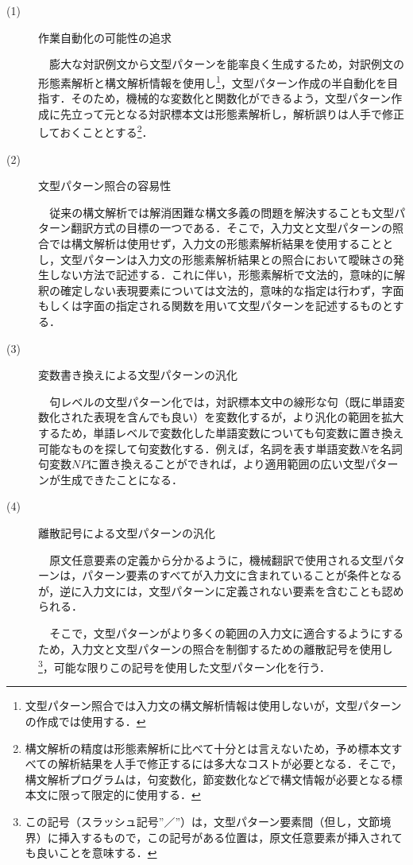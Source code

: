 \documentclass{nlp}
\begin{document}
\begin{description}
\item[(1)]作業自動化の可能性の追求 

\verb|  |膨大な対訳例文から文型パターンを能率良く生成するため，対訳例文の形態素解析と構文解析情報を使用し\footnote{文型パターン照合では入力文の構文解析情報は使用しないが，文型パターンの作成では使用する．}，文型パターン作成の半自動化を目指す．そのため，機械的な変数化と関数化ができるよう，文型パターン作成に先立って元となる対訳標本文は形態素解析し，解析誤りは人手で修正しておくこととする\footnote{構文解析の精度は形態素解析に比べて十分とは言えないため，予め標本文すべての解析結果を人手で修正するには多大なコストが必要となる．そこで，構文解析プログラムは，句変数化，節変数化などで構文情報が必要となる標本文に限って限定的に使用する．}．

\item[(2)]文型パターン照合の容易性 

\verb|  |従来の構文解析では解消困難な構文多義の問題を解決することも文型パターン翻訳方式の目標の一つである．そこで，入力文と文型パターンの照合では構文解析は使用せず，入力文の形態素解析結果を使用することとし，文型パターンは入力文の形態素解析結果との照合において曖昧さの発生しない方法で記述する．これに伴い，形態素解析で文法的，意味的に解釈の確定しない表現要素については文法的，意味的な指定は行わず，字面もしくは字面の指定される関数を用いて文型パターンを記述するものとする．

\item[(3)]変数書き換えによる文型パターンの汎化 

\verb|  |句レベルの文型パターン化では，対訳標本文中の線形な句（既に単語変数化された表現を含んでも良い）を変数化するが，より汎化の範囲を拡大するため，単語レベルで変数化した単語変数についても句変数に置き換え可能なものを探して句変数化する．例えば，名詞を表す単語変数$N$を名詞句変数$NP$に置き換えることができれば，より適用範囲の広い文型パターンが生成できたことになる．

\item[(4)]離散記号による文型パターンの汎化 

\verb|  |原文任意要素の定義から分かるように，機械翻訳で使用される文型パターンは，パターン要素のすべてが入力文に含まれていることが条件となるが，逆に入力文には，文型パターンに定義されない要素を含むことも認められる．

\verb|  |そこで，文型パターンがより多くの範囲の入力文に適合するようにするため，入力文と文型パターンの照合を制御するための離散記号を使用し\footnote{この記号（スラッシュ記号”／”）は，文型パターン要素間（但し，文節境界）に挿入するもので，この記号がある位置は，原文任意要素が挿入されても良いことを意味する．}，可能な限りこの記号を使用した文型パターン化を行う．


\end{description}
\end{document}
